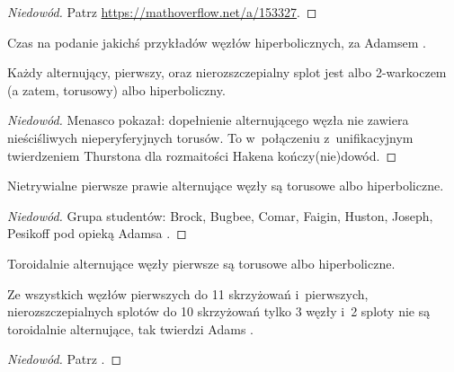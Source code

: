 \begin{proof}[Niedowód]
    Patrz \url{https://mathoverflow.net/a/153327}.
\end{proof}

Czas na podanie jakichś przykładów węzłów hiperbolicznych, za Adamsem \cite{adams2005}.

\begin{proposition}
    Każdy alternujący, pierwszy, oraz nierozszczepialny splot jest albo 2-warkoczem (a zatem, torusowy) albo hiperboliczny.
%
%
%
\end{proposition}

\begin{proof}[Niedowód]
    Menasco \cite{menasco1984} pokazał: dopełnienie alternującego węzła nie zawiera nieściśliwych nieperyferyjnych torusów.
%
    To w~połączeniu z~unifikacyjnym twierdzeniem Thurstona dla rozmaitości Hakena kończy(nie)dowód.
%
\end{proof}

\begin{proposition}
    Nietrywialne pierwsze prawie alternujące węzły są torusowe albo hiperboliczne.
%
%
\end{proposition}

\begin{proof}[Niedowód]
    Grupa studentów: Brock, Bugbee, Comar, Faigin, Huston, Joseph, Pesikoff pod opieką Adamsa \cite{brock1992}.
%
%
%
%
%
%
%
%
\end{proof}

\begin{proposition}
    Toroidalnie alternujące węzły pierwsze są torusowe albo hiperboliczne.
\end{proposition}

Ze wszystkich węzłów pierwszych do 11 skrzyżowań i~pierwszych, nierozszczepialnych splotów do 10 skrzyżowań tylko 3 węzły i~2 sploty nie są toroidalnie alternujące, tak twierdzi Adams \cite{adams2005}.

\begin{proof}[Niedowód]
    Patrz \cite{adamsc1994}.
\end{proof}

